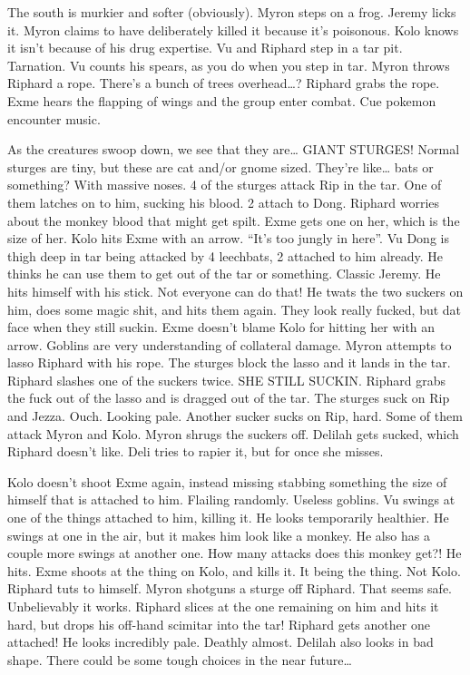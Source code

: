 The south is murkier and softer (obviously). Myron steps on a frog. Jeremy licks it. Myron claims to have deliberately killed it because it’s poisonous. Kolo knows it isn’t because of his drug expertise. Vu and Riphard step in a tar pit. Tarnation. Vu counts his spears, as you do when you step in tar. Myron throws Riphard a rope. There’s a bunch of trees overhead…? Riphard grabs the rope. Exme hears the flapping of wings and the group enter combat. Cue pokemon encounter music. \medskip

As the creatures swoop down, we see that they are… GIANT STURGES! Normal sturges are tiny, but these are cat and/or gnome sized. They’re like… bats or something? With massive noses. 4 of the sturges attack Rip in the tar. One of them latches on to him, sucking his blood. 2 attach to Dong. Riphard worries about the monkey blood that might get spilt. Exme gets one on her, which is the size of her. Kolo hits Exme with an arrow. “It’s too jungly in here”. Vu Dong is thigh deep in tar being attacked by 4 leechbats, 2 attached to him already. He thinks he can use them to get out of the tar or something. Classic Jeremy. He hits himself with his stick. Not everyone can do that! He twats the two suckers on him, does some magic shit, and hits them again. They look really fucked, but dat face when they still suckin. Exme doesn’t blame Kolo for hitting her with an arrow. Goblins are very understanding of collateral damage. Myron attempts to lasso Riphard with his rope. The sturges block the lasso and it lands in the tar. Riphard slashes one of the suckers twice. SHE STILL SUCKIN. Riphard grabs the fuck out of the lasso and is dragged out of the tar. The sturges suck on Rip and Jezza. Ouch. Looking pale. Another sucker sucks on Rip, hard. Some of them attack Myron and Kolo. Myron shrugs the suckers off. Delilah gets sucked, which Riphard doesn’t like. Deli tries to rapier it, but for once she misses.\medskip

Kolo doesn’t shoot Exme again, instead missing stabbing something the size of himself that is attached to him. Flailing randomly. Useless goblins. Vu swings at one of the things attached to him, killing it. He looks temporarily healthier. He swings at one in the air, but it makes him look like a monkey. He also has a couple more swings at another one. How many attacks does this monkey get?! He hits. Exme shoots at the thing on Kolo, and kills it. It being the thing. Not Kolo. Riphard tuts to himself. Myron shotguns a sturge off Riphard. That seems safe. Unbelievably it works. Riphard slices at the one remaining on him and hits it hard, but drops his off-hand scimitar into the tar! Riphard gets another one attached! He looks incredibly pale. Deathly almost. Delilah also looks in bad shape. There could be some tough choices in the near future…\medskip


